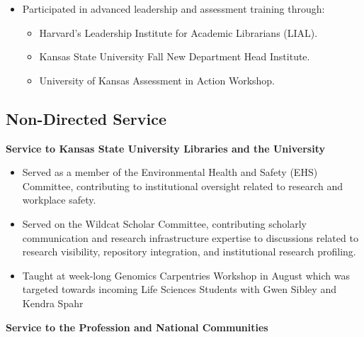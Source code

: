 \begin{itemize}
  \item Participated in advanced leadership and assessment training through:
    \begin{itemize}
      \item Harvard’s Leadership Institute for Academic Librarians (LIAL).
      \item Kansas State University Fall New Department Head Institute.
      \item University of Kansas Assessment in Action Workshop.
    \end{itemize}

\end{itemize}

\subsection*{Non-Directed Service}

\textbf{Service to Kansas State University Libraries and the University}

\begin{itemize}

  \item Served as a member of the Environmental Health and Safety (EHS) Committee, contributing to institutional oversight related to research and workplace safety.

  \item Served on the Wildcat Scholar Committee, contributing scholarly communication and research infrastructure expertise to discussions related to research visibility, repository integration, and institutional research profiling.

  \item Taught at week-long Genomics Carpentries Workshop in August which was targeted towards incoming Life Sciences Students with Gwen Sibley and Kendra Spahr
\end{itemize}

\vspace{0.5em}

\textbf{Service to the Profession and National Communities}

